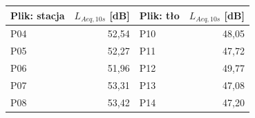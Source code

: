 \begin{tabular}{@{}lrlr@{}}
\toprule
Plik: stacja & $L_{Aeq,10s}$ [dB] & Plik: tło & $L_{Aeq,10s}$ [dB] \\
\midrule
P04 & 52,54 & P10 & 48,05 \\
P05 & 52,27 & P11 & 47,72 \\
P06 & 51,96 & P12 & 49,77 \\
P07 & 53,31 & P13 & 47,08 \\
P08 & 53,42 & P14 & 47,20 \\
\bottomrule
\end{tabular}
